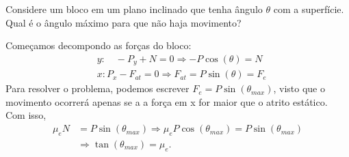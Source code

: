 \documentclass[physics_notes.tex]{subfiles}
\begin{document}
\begin{example}
	Considere um bloco em um plano inclinado que tenha ângulo $\theta $ com a superfície. Qual é o ângulo máximo para que não haja movimento?

	Começamos decompondo as forças do bloco:
	\begin{align*}
		 & y:\quad -P_{y} + N = 0 \Rightarrow -P\cos{(\theta )} = N            \\
		 & x: P_{x} - F_{at} = 0 \Rightarrow F_{at} = P\sin{(\theta )} = F_{e}
	\end{align*}
	Para resolver o problema, podemos escrever $F_{e} = P\sin{(\theta_{max} )}$, visto que o movimento ocorrerá
	apenas se a a força em x for maior que o atrito estático. Com isso,
	\begin{align*}
		\mu_{e}N & = P\sin{(\theta_{max})} \Rightarrow \mu_{e}P\cos{(\theta_{max})} = P\sin{(\theta_{max})} \\
		         & \Rightarrow \tan{(\theta_{max})} = \mu_{e}.
	\end{align*}
\end{example}
\end{document}
